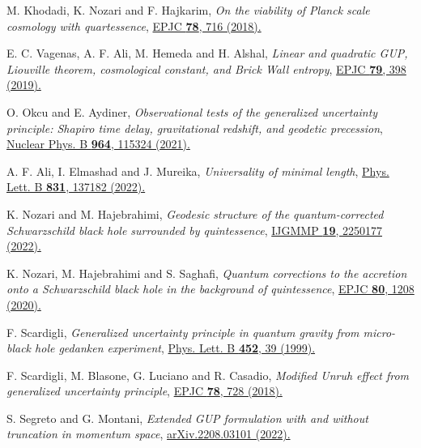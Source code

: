 \documentclass[aps,amsmath,amssymb,showpacs,showkeys]{revtex4}
\begin{document}
\begin{thebibliography}{99}
M. Khodadi, K. Nozari and F. Hajkarim, \textit{On the viability of Planck scale cosmology with quartessence}, \href{https://link.springer.com/article/10.1140/epjc/s10052-018-6191-4}{EPJC \textbf{78}, 716 (2018).}

E. C. Vagenas, A. F. Ali, M. Hemeda and H. Alshal, \textit{Linear and quadratic GUP, Liouville theorem, cosmological constant, and Brick Wall entropy}, \href{https://link.springer.com/article/10.1140/epjc/s10052-019-6908-z}{EPJC \textbf{79}, 398 (2019).}

O. Okcu and E. Aydiner, \textit{Observational tests of the generalized uncertainty principle: Shapiro time delay, gravitational redshift, and geodetic precession}, \href{https://www.sciencedirect.com/science/article/pii/S0550321321000213?via%3Dihub}{Nuclear Phys. B \textbf{964}, 115324 (2021).}

A. F. Ali, I. Elmashad and J. Mureika, \textit{Universality of minimal length}, \href{https://www.sciencedirect.com/science/article/pii/S0370269322003161?via%3Dihub}{Phys. Lett. B \textbf{831}, 137182 (2022).}

K. Nozari and M. Hajebrahimi, \textit{Geodesic structure of the quantum-corrected Schwarzschild black hole surrounded by quintessence}, \href{https://www.worldscientific.com/doi/abs/10.1142/S0219887822501778}{IJGMMP \textbf{19}, 2250177 (2022).}

K. Nozari, M. Hajebrahimi and S. Saghafi, \textit{Quantum corrections to the accretion onto a Schwarzschild black hole in the background of quintessence}, \href{https://link.springer.com/article/10.1140/epjc/s10052-020-08782-2}{EPJC \textbf{80}, 1208 (2020).}

F. Scardigli, \textit{Generalized uncertainty principle in quantum gravity from micro-black hole gedanken experiment}, \href{https://www.sciencedirect.com/science/article/abs/pii/S0370269399001677?via%3Dihub}{Phys. Lett. B \textbf{452}, 39 (1999). }

F. Scardigli, M. Blasone, G. Luciano and R. Casadio, \textit{Modified Unruh effect from generalized uncertainty principle}, \href{https://link.springer.com/article/10.1140/epjc/s10052-018-6209-y}{EPJC \textbf{78}, 728 (2018).}

S. Segreto and G. Montani, \textit{Extended GUP formulation with and without truncation in momentum space}, \href{https://doi.org/10.48550/arXiv.2208.03101}{arXiv.2208.03101 (2022).}


\end{thebibliography}
\end{document}
